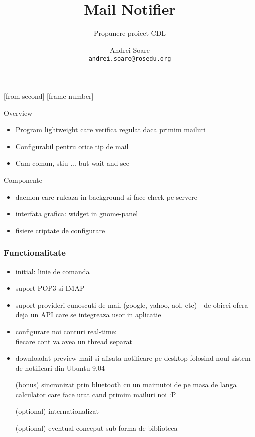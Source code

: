 \documentclass{beamer}
\title{Mail Notifier}
\subtitle{Propunere proiect CDL}
\institute{ROSEdu}
\author{Andrei Soare \\ \texttt{andrei.soare@rosedu.org}}
\begin{document}
[from second]
[frame number]

\frame{\titlepage}

\begin{frame}{Overview}
\begin{itemize}
\item Program lightweight care verifica regulat daca primim mailuri
\item Configurabil pentru orice tip de mail\vspace{1cm}\pause
\item Cam comun, stiu ... but wait and see
\end{itemize}
\end{frame}

\begin{frame}{Componente}
\begin{itemize}
\item daemon care ruleaza in background si face check pe servere
\item interfata grafica: widget in gnome-panel
\item fisiere criptate de configurare
\end{itemize}
\end{frame}

\begin{frame}[allowframebreaks]
\frametitle{Functionalitate}
\begin{itemize}
\item initial: linie de comanda
\item suport POP3 si IMAP
\item suport provideri cunoscuti de mail (google, yahoo, aol, etc) - de obicei
ofera deja un API care se integreaza usor in aplicatie
\item configurare noi conturi real-time:\\fiecare cont va avea un thread separat
\item downloadat preview mail si afisata notificare pe desktop folosind noul sistem
de notificari din Ubuntu 9.04\framebreak
\item [(bonus)] sincronizat prin bluetooth cu un maimutoi de pe masa de langa calculator
care face urat cand primim mailuri noi :P
\item [(optional)]internationalizat
\item [(optional)] eventual conceput sub forma de biblioteca
\end{itemize}
\end{frame}
\end{document}
